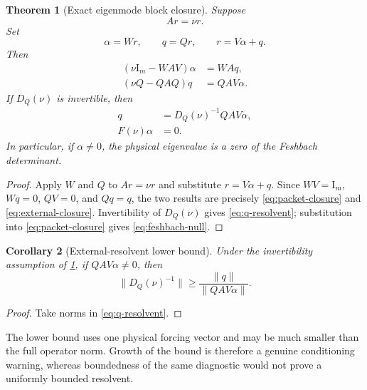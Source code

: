 \documentclass[11pt]{article}
\newtheorem{theorem}{Theorem}[section]
\newtheorem{corollary}[theorem]{Corollary}
\theoremstyle{definition}
\theoremstyle{remark}
\newcommand{\Id}{\mathrm I}
\begin{document}
\begin{theorem}[Exact eigenmode block closure]
\label{thm:eigenmode-closure}
Suppose
\begin{equation}
\label{eq:abstract-eigenpair}
 Ar=\nu r.
\end{equation}
Set
\begin{equation}
\label{eq:alpha-q}
 \alpha=Wr,
 \qquad
 q=Qr,
 \qquad
 r=V\alpha+q.
\end{equation}
Then
\begin{align}
 (\nu\Id_m-WAV)\alpha&=WAq,
 \label{eq:packet-closure}\\
 (\nu Q-QAQ)q&=QAV\alpha.
 \label{eq:external-closure}
\end{align}
If $D_Q(\nu)$ is invertible, then
\begin{align}
 q&=D_Q(\nu)^{-1}QAV\alpha,
 \label{eq:q-resolvent}\\
 F(\nu)\alpha&=0.
 \label{eq:feshbach-null}
\end{align}
In particular, if $\alpha\ne0$, the physical eigenvalue is a zero of the
Feshbach determinant.
\end{theorem}

\begin{proof}
Apply $W$ and $Q$ to $Ar=\nu r$ and substitute
$r=V\alpha+q$.  Since $WV=\Id_m$, $Wq=0$, $QV=0$, and $Qq=q$, the two
results are precisely \eqref{eq:packet-closure} and
\eqref{eq:external-closure}.  Invertibility of $D_Q(\nu)$ gives
\eqref{eq:q-resolvent}; substitution into \eqref{eq:packet-closure} gives
\eqref{eq:feshbach-null}.
\end{proof}

\begin{corollary}[External-resolvent lower bound]
\label{cor:resolvent-lower-bound}
Under the invertibility assumption of
\cref{thm:eigenmode-closure}, if $QAV\alpha\ne0$, then
\begin{equation}
\label{eq:resolvent-lower-bound}
 \boxed{
 \|D_Q(\nu)^{-1}\|
 \ge
 \frac{\|q\|}{\|QAV\alpha\|}}.
\end{equation}
\end{corollary}

\begin{proof}
Take norms in \eqref{eq:q-resolvent}.
\end{proof}

The lower bound uses one physical forcing vector and may be much smaller
than the full operator norm.  Growth of the bound is therefore a genuine
conditioning warning, whereas boundedness of the same diagnostic would not
prove a uniformly bounded resolvent.
\end{document}
